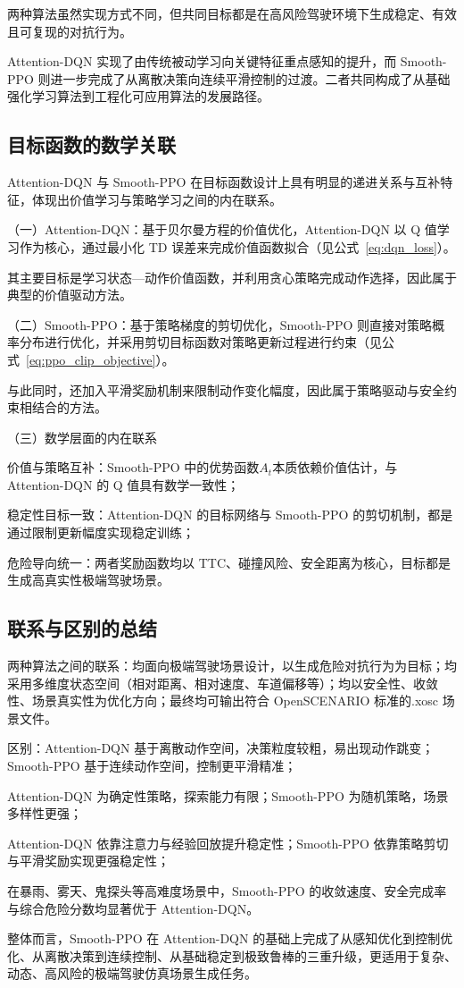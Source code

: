 两种算法虽然实现方式不同，但共同目标都是在高风险驾驶环境下生成稳定、有效且可复现的对抗行为。

Attention-DQN 实现了由传统被动学习向关键特征重点感知的提升，而 Smooth-PPO 则进一步完成了从离散决策向连续平滑控制的过渡。二者共同构成了从基础强化学习算法到工程化可应用算法的发展路径。

\subsection{目标函数的数学关联}
Attention-DQN 与 Smooth-PPO 在目标函数设计上具有明显的递进关系与互补特征，体现出价值学习与策略学习之间的内在联系。

（一）Attention-DQN：基于贝尔曼方程的价值优化，Attention-DQN 以 Q 值学习作为核心，通过最小化 TD 误差来完成价值函数拟合（见公式~\eqref{eq:dqn_loss}）。

其主要目标是学习状态—动作价值函数，并利用贪心策略完成动作选择，因此属于典型的价值驱动方法。

（二）Smooth-PPO：基于策略梯度的剪切优化，Smooth-PPO 则直接对策略概率分布进行优化，并采用剪切目标函数对策略更新过程进行约束（见公式~\eqref{eq:ppo_clip_objective}）。

与此同时，还加入平滑奖励机制来限制动作变化幅度，因此属于策略驱动与安全约束相结合的方法。

（三）数学层面的内在联系

价值与策略互补：Smooth-PPO 中的优势函数$A_t$本质依赖价值估计，与 Attention-DQN 的 Q 值具有数学一致性；

稳定性目标一致：Attention-DQN 的目标网络与 Smooth-PPO 的剪切机制，都是通过限制更新幅度实现稳定训练；

危险导向统一：两者奖励函数均以 TTC、碰撞风险、安全距离为核心，目标都是生成高真实性极端驾驶场景。

\subsection{联系与区别的总结}
两种算法之间的联系：均面向极端驾驶场景设计，以生成危险对抗行为为目标；均采用多维度状态空间（相对距离、相对速度、车道偏移等）；均以安全性、收敛性、场景真实性为优化方向；最终均可输出符合 OpenSCENARIO 标准的.xosc 场景文件。

区别：Attention-DQN 基于离散动作空间，决策粒度较粗，易出现动作跳变；Smooth-PPO 基于连续动作空间，控制更平滑精准；

Attention-DQN 为确定性策略，探索能力有限；Smooth-PPO 为随机策略，场景多样性更强；

Attention-DQN 依靠注意力与经验回放提升稳定性；Smooth-PPO 依靠策略剪切与平滑奖励实现更强稳定性；

在暴雨、雾天、鬼探头等高难度场景中，Smooth-PPO 的收敛速度、安全完成率与综合危险分数均显著优于 Attention-DQN。

整体而言，Smooth-PPO 在 Attention-DQN 的基础上完成了从感知优化到控制优化、从离散决策到连续控制、从基础稳定到极致鲁棒的三重升级，更适用于复杂、动态、高风险的极端驾驶仿真场景生成任务。